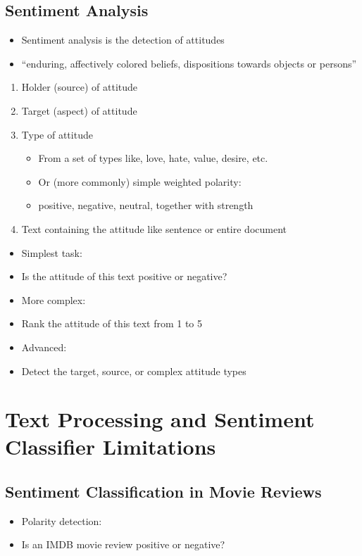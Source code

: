 \documentclass[11pt]{article}
\theoremstyle{definition}
\begin{document}
\subsection{Sentiment Analysis}
\begin{itemize}
  \item Sentiment analysis is the detection of attitudes
  \item “enduring, affectively colored beliefs, dispositions towards objects or persons”
\end{itemize}
\begin{enumerate}
  \item Holder (source) of attitude
  \item Target (aspect) of attitude
  \item Type of attitude
  \begin{itemize}
    \item From a set of types like, love, hate, value, desire, etc.
    \item Or (more commonly) simple weighted polarity: 
    \item positive, negative, neutral, together with strength
  \end{itemize}
  \item Text containing the attitude like sentence or entire document
\end{enumerate}
\begin{itemize}
  \item Simplest task:
  \item Is the attitude of this text positive or negative?
  \item More complex:
  \item Rank the attitude of this text from 1 to 5
  \item Advanced:
  \item Detect the target, source, or complex attitude types
\end{itemize}

\section{Text Processing and
Sentiment Classifier
Limitations}
\subsection{Sentiment Classification in Movie Reviews}
\begin{itemize}
  \item Polarity detection:
  \item Is an IMDB movie review positive or negative?
\end{itemize}
\end{document}
